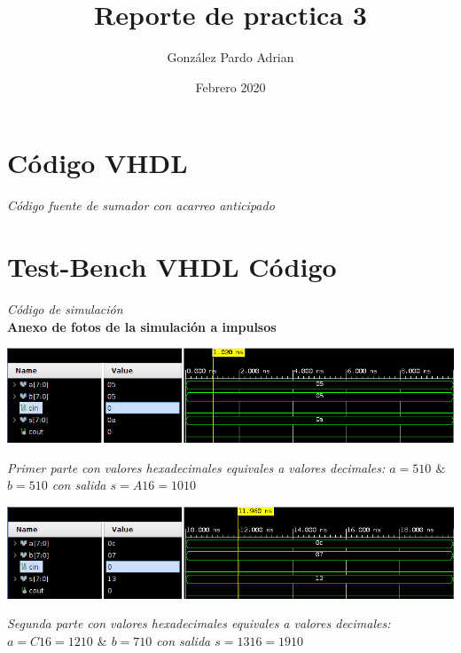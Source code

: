 \documentclass[12pt,executivepaper]{article}
\author{González Pardo Adrian}
\date{Febrero 2020}
\title{Reporte de practica 3}
\begin{document}
\maketitle
\section{Código VHDL}
\begin{center}
    
    \textit{Código fuente de sumador con acarreo anticipado}
\end{center}
\section{Test-Bench VHDL Código}
\begin{center}
    
    \textit{Código de simulación}\\
    \textbf{Anexo de fotos de la simulación a impulsos}
\end{center}

\begin{flushleft}
	\includegraphics[scale=0.55]{imgs/primera.png}
\end{flushleft}
\begin{center}
    \textit{Primer parte con valores hexadecimales equivales a valores decimales: $a=5{\scriptscriptstyle10}$ $\&$ $b=5{\scriptscriptstyle10}$ con salida $s = A{\scriptscriptstyle16}= 10{\scriptscriptstyle10}$}  
\end{center}

\begin{flushleft}
	\includegraphics[scale=0.55]{imgs/segunda.png}
\end{flushleft}
\begin{center}
    \textit{Segunda parte con valores hexadecimales equivales a valores decimales: $a=C{\scriptscriptstyle16}=12{\scriptscriptstyle10}$ $\&$ $b=7{\scriptscriptstyle10}$ con salida $s = 13{\scriptscriptstyle16}= 19{\scriptscriptstyle10}$}  
\end{center}
\end{document}
